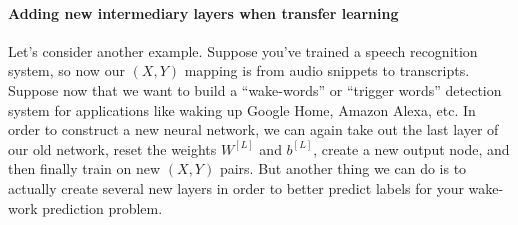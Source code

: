 \documentclass[12pt]{article}
\begin{document}
\paragraph{Adding new intermediary layers when transfer learning}
Let's consider another example. Suppose you've trained a speech recognition system, so now our $(X,Y)$ mapping is from audio snippets to transcripts. Suppose now that we want to build a ``wake-words'' or ``trigger words'' detection system for applications like
waking up Google Home, Amazon Alexa, etc. In order to construct a new neural network, we can again take out the last layer of our
old network, reset the weights $W^{[L]}$ and $b^{[L]}$, create a new output node, and then finally train on new $(X,Y)$ pairs. But
another thing we can do is to actually create several new layers in order to better predict labels for your wake-work prediction
problem.
\end{document}
